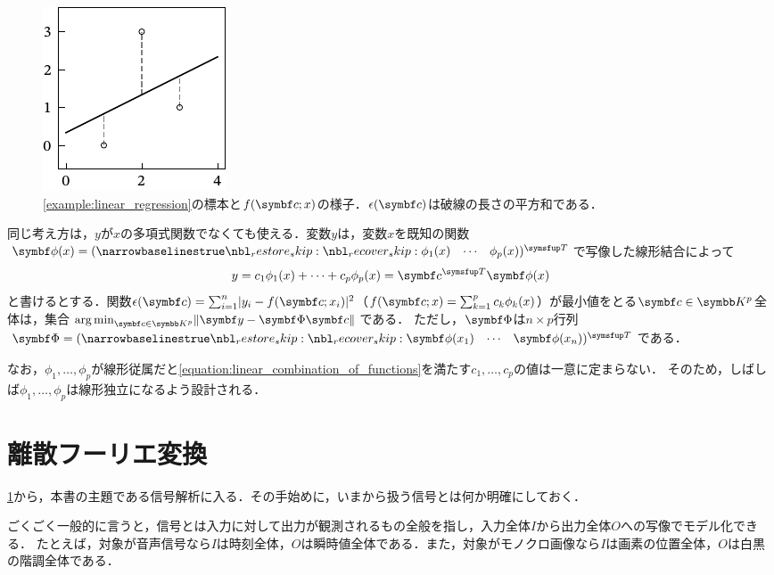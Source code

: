 \documentclass[../../main]{subfiles}
\begin{document}
\begin{figure}[htbp]
  \centering
  \includegraphics{figures/linear_regression.pdf}
  \caption{\cref{example:linear_regression}の標本と\(f(\vect{c};x)\)の様子．\(\epsilon(\vect{c})\)は破線の長さの平方和である．}
\end{figure}

同じ考え方は，\(y\)が\(x\)の多項式関数でなくても使える．変数\(y\)は，変数\(x\)を既知の関数\(\vect{\phi}(x)=\trps{\rowvect{\phi_1(x) & \cdots & \phi_p(x)}}\)で写像した線形結合によって
\begin{equation}
  \label{equation:linear_combination_of_functions}
  y = c_1\phi_1(x)+\dots+c_p\phi_p(x)
  = \trps{\vect{c}}\vect{\phi}(x)
\end{equation}
と書けるとする．関数\(\epsilon(\vect{c})=\sum_{i=1}^n\abs{y_i-f(\vect{c};x_i)}^2\)（\(f(\vect{c};x)=\sum_{k=1}^pc_k\phi_k(x)\)）が最小値をとる\(\vect{c}\in\numset{K}^p\)全体は，集合\(\argmin_{\vect{c}\in\numset{K}^p}\vnorm{\vect{y}-\mat{\Phi}\vect{c}}\)である．
ただし，\(\mat{\Phi}\)は\(n\times p\)行列\(\mat{\Phi}=\trps{\rowvect{\vect{\phi}(x_1) & \cdots & \vect{\phi}(x_n)}}\)である．

なお，\(\phi_1,\dots,\phi_p\)が線形従属だと\cref{equation:linear_combination_of_functions}を満たす\(c_1,\dots,c_p\)の値は一意に定まらない．
そのため，しばしば\(\phi_1,\dots,\phi_p\)は線形独立になるよう設計される．

\section{離散フーリエ変換}
\label{section:dft}

\cref{section:dft}から，本書の主題である信号解析に入る．その手始めに，いまから扱う信号とは何か明確にしておく．

ごくごく一般的に言うと，信号とは入力に対して出力が観測されるもの全般を指し，入力全体\(I\)から出力全体\(O\)への写像でモデル化できる．
たとえば，対象が音声信号なら\(I\)は時刻全体，\(O\)は瞬時値全体である．また，対象がモノクロ画像なら\(I\)は画素の位置全体，\(O\)は白黒の階調全体である．
\end{document}
